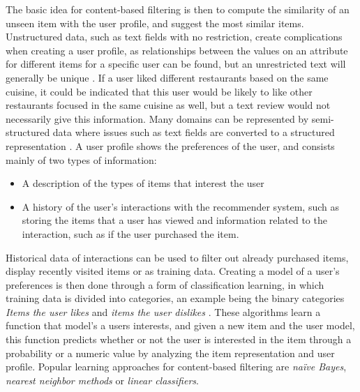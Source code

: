 \noindent
The basic idea for content-based filtering is then to compute the similarity of an unseen item with the user profile, and suggest the most similar items.
Unstructured data, such as text fields with no restriction, create complications when creating a user profile, as relationships between the values on an attribute for different items for a specific user can be found, but an unrestricted text will generally be unique \cite{ContentBasedFiltering}. 
If a user liked different restaurants based on the same cuisine, it could be indicated that this user would be likely to like other restaurants focused in the same cuisine as well, but a text review would not necessarily give this information.
Many domains can be represented by semi-structured data where issues such as text fields are converted to a structured representation \cite{ContentBasedFiltering}.
A user profile shows the preferences of the user, and consists mainly of two types of information:
\begin{itemize}
    \item A description of the types of items that interest the user
    \item A history of the user's interactions with the recommender system, such as storing the items that a user has viewed and information related to the interaction, such as if the user purchased the item.
\end{itemize}
Historical data of interactions can be used to filter out already purchased items, display recently visited items or as training data.
Creating a model of a user's preferences is then done through a form of classification learning, in which training data is divided into categories, an example being the binary categories \textit{Items the user likes} and \textit{items the user dislikes} \cite{ContentBasedFiltering}.
These algorithms learn a function that model's a users interests, and given a new item and the user model, this function predicts whether or not the user is interested in the item through a probability or a numeric value by analyzing the item representation and user profile.
Popular learning approaches for content-based filtering are \textit{naïve Bayes}, \textit{nearest neighbor methods} or \textit{linear classifiers}.

